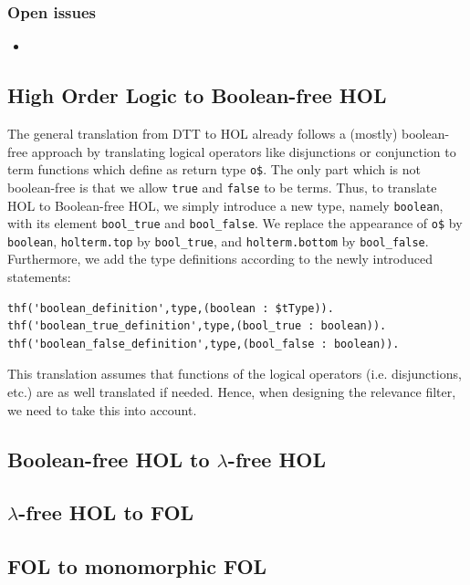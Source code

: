 \documentclass[a4paper]{article}
\begin{document}
\subsubsection{Open issues}
\begin{itemize}
	\item 
\end{itemize}
\subsection{High Order Logic to Boolean-free HOL}
\label{sec:hol_to_boolean_free}
The general translation from DTT to HOL already follows a (mostly) boolean-free approach by translating logical operators like disjunctions or conjunction to term functions which define as return type \texttt{o\$}. The only part which is not boolean-free is that we allow \texttt{true} and \texttt{false} to be terms. Thus, to translate HOL to Boolean-free HOL, we simply introduce a new type, namely \texttt{boolean}, with its element \texttt{bool\_true} and \texttt{bool\_false}. We replace the appearance of \texttt{o\$} by \texttt{boolean}, \texttt{holterm.top} by \texttt{bool\_true}, and \texttt{holterm.bottom} by \texttt{bool\_false}. Furthermore, we add the type definitions according to the newly introduced statements:
\begin{verbatim}
thf('boolean_definition',type,(boolean : $tType)).
thf('boolean_true_definition',type,(bool_true : boolean)).
thf('boolean_false_definition',type,(bool_false : boolean)).
\end{verbatim}
This translation assumes that functions of the logical operators (i.e. disjunctions, etc.) are as well translated if needed. Hence, when designing the relevance filter, we need to take this into account.
\subsection{Boolean-free HOL to $\lambda$-free HOL}
\subsection{$\lambda$-free HOL to FOL}
\subsection{FOL to monomorphic FOL}
\end{document}
